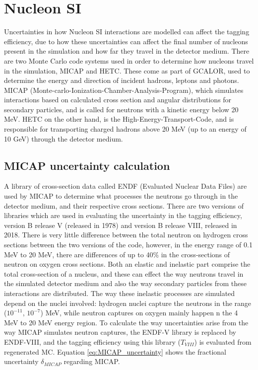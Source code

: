 \section{Nucleon SI}
Uncertainties in how Nucleon SI interactions are modelled can affect the tagging efficiency, due to how these uncertainties can affect the final number of nucleons present in the simulation and how far they travel in the detector medium. There are two Monte Carlo code systems used in order to determine how nucleons travel in the simulation, MICAP and HETC. These come as part of GCALOR, used to determine the energy and direction of incident hadrons, leptons and photons. MICAP (Monte-carlo-Ionization-Chamber-Analysis-Program), which simulates interactions based on calculated cross section and angular distributions for secondary particles, and is called for neutrons with a kinetic energy below 20 MeV. HETC on the other hand, is the High-Energy-Transport-Code, and is responsible for transporting charged hadrons above 20 MeV (up to an energy of 10 GeV) through the detector medium. 

\subsection{MICAP uncertainty calculation}

A library of cross-section data called ENDF (Evaluated Nuclear Data Files) are used by MICAP to determine what processes the neutrons go through in the detector medium, and their respective cross sections. There are two versions of libraries which are used in evaluating the uncertainty in the tagging efficiency, version B release V (released in 1978) and version B release VIII, released in 2018. There is very little difference between the total neutron on hydrogen cross sections between the two versions of the code, however, in the energy range of 0.1 MeV to 20 MeV, there are differences of up to 40\% in the cross-sections of neutron on oxygen cross sections. Both an elastic and inelastic part comprise the total cross-section of a nucleus, and these can effect the way neutrons travel in the simulated detector medium and also the way secondary particles from these interactions are distributed. The way these inelastic processes are simulated depend on the nuclei involved: hydrogen nuclei capture the neutrons in the range ($10^{-11}$, $10^{-7}$) MeV, while neutron captures on oxygen mainly happen n the 4 MeV to 20 MeV energy region.  To calculate the way uncertainties arise from the way MICAP simulates neutron captures, the ENDF-V library is replaced by ENDF-VIII, and the tagging efficiency using this library ($T_{VIII}$) is evaluated from regenerated MC. Equation \ref{eq:MICAP_uncertainty} shows the fractional uncertainty $\delta_{MICAP}$ regarding MICAP.  

